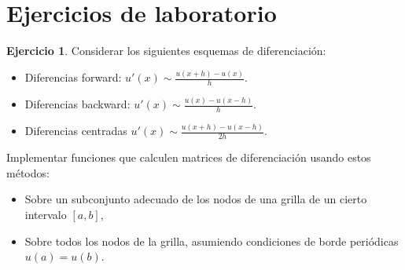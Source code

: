 \documentclass[12pt, a4paper]{amsbook}
\theoremstyle{remark}
\theoremstyle{definition}
\newtheorem{ejer}[teo]{Ejercicio}
\numberwithin{section}{chapter}
\numberwithin{subsection}{section}
\numberwithin{equation}{section}
\numberwithin{figure}{chapter}
\begin{document}
%
%
%
%

\section{Ejercicios de laboratorio}

\begin{ejer}
Considerar los siguientes esquemas de diferenciación:
\begin{itemize}
  \item Diferencias forward: $u'(x) \sim \frac{u(x+h)-u(x)}{h}$.
  \item Diferencias backward: $u'(x) \sim \frac{u(x)-u(x-h)}{h}$.
  \item Diferencias centradas $u'(x) \sim \frac{u(x+h)-u(x-h)}{2h}$.
\end{itemize}
Implementar funciones que calculen matrices de diferenciación usando estos métodos:
\begin{itemize}
  \item Sobre un subconjunto adecuado de los nodos de una grilla de un cierto intervalo $[a,b]$,
  \item Sobre todos los nodos de la grilla, asumiendo condiciones de borde periódicas $u(a)=u(b)$. 
\end{itemize}
\end{ejer}
\end{document}
